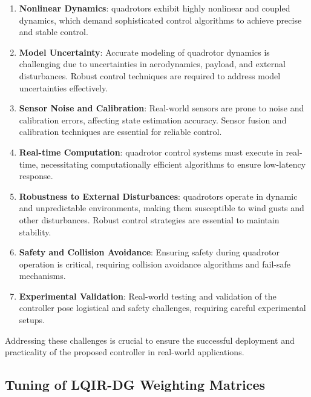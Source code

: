 \documentclass[3p]{elsarticle}
\begin{document}
\begin{enumerate}
  \item \textbf{Nonlinear Dynamics}: quadrotors exhibit highly nonlinear and coupled dynamics, which demand sophisticated control algorithms to achieve precise and stable control.

  \item \textbf{Model Uncertainty}: Accurate modeling of quadrotor dynamics is challenging due to uncertainties in aerodynamics, payload, and external disturbances. Robust control techniques are required to address model uncertainties effectively.

  \item \textbf{Sensor Noise and Calibration}: Real-world sensors are prone to noise and calibration errors, affecting state estimation accuracy. Sensor fusion and calibration techniques are essential for reliable control.

  \item \textbf{Real-time Computation}: quadrotor control systems must execute in real-time, necessitating computationally efficient algorithms to ensure low-latency response.

  \item \textbf{Robustness to External Disturbances}: quadrotors operate in dynamic and unpredictable environments, making them susceptible to wind gusts and other disturbances. Robust control strategies are essential to maintain stability.

  \item \textbf{Safety and Collision Avoidance}: Ensuring safety during quadrotor operation is critical, requiring collision avoidance algorithms and fail-safe mechanisms.

  \item \textbf{Experimental Validation}: Real-world testing and validation of the controller pose logistical and safety challenges, requiring careful experimental setups.

\end{enumerate}

Addressing these challenges is crucial to ensure the successful deployment and practicality of the proposed controller in real-world applications.

\subsection{Tuning of LQIR-DG Weighting Matrices}
\end{document}
